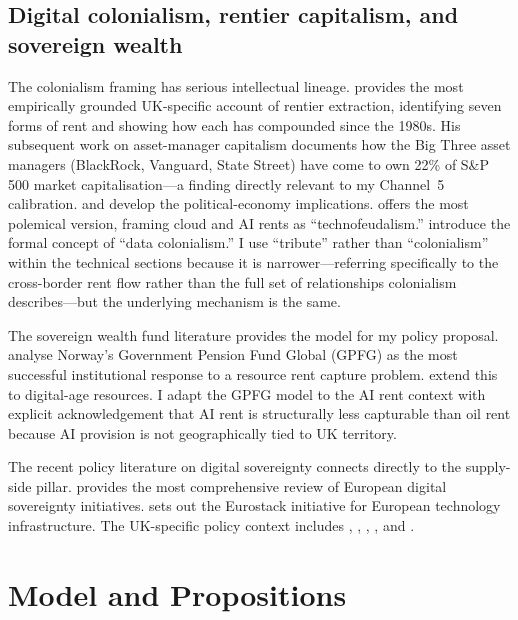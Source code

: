 \documentclass[11pt,letterpaper]{article}
\theoremstyle{remark}
\begin{document}
\subsection{Digital colonialism, rentier capitalism, and sovereign wealth}

The colonialism framing has serious intellectual lineage. \citet{christophers_2020} provides the most empirically grounded {UK}-specific account of rentier extraction, identifying seven forms of rent and showing how each has compounded since the 1980s. His subsequent work on asset-manager capitalism \citep{christophers_2023, braun_christophers_2024} documents how the Big Three asset managers ({BlackRock}, Vanguard, State Street) have come to own 22\% of S\&P 500 market capitalisation---a finding directly relevant to my Channel~5 calibration. \citet{mazzucato_2018, mazzucato_2021} and \citet{mazzucato_collington_2024} develop the political-economy implications. \citet{varoufakis_2023} offers the most polemical version, framing cloud and {AI} rents as ``technofeudalism.'' \citet{couldry_mejias_2019} introduce the formal concept of ``data colonialism.'' I use ``tribute'' rather than ``colonialism'' within the technical sections because it is narrower---referring specifically to the cross-border rent flow rather than the full set of relationships colonialism describes---but the underlying mechanism is the same.

The sovereign wealth fund literature provides the model for my policy proposal. \citet{mehlum_moene_torvik_2006, mehlum_moene_torvik_2024} analyse Norway's Government Pension Fund Global ({GPFG}) as the most successful institutional response to a resource rent capture problem. \citet{vanderploeg_venables_2023} extend this to digital-age resources. I adapt the {GPFG} model to the {AI} rent context with explicit acknowledgement that {AI} rent is structurally less capturable than oil rent because {AI} provision is not geographically tied to {UK} territory.

The recent policy literature on digital sovereignty connects directly to the supply-side pillar. \citet{atlantic_council_2026} provides the most comprehensive review of European digital sovereignty initiatives. \citet{caffarra_2025} sets out the {Eurostack} initiative for European technology infrastructure. The {UK}-specific policy context includes \citet{coyle_2024}, \citet{bennett_2024, bennett_2025}, \citet{bcc_atos_2026}, \citet{bank_of_england_2025}, and \citet{dsit_2026}.

\section{Model and Propositions}
\end{document}
